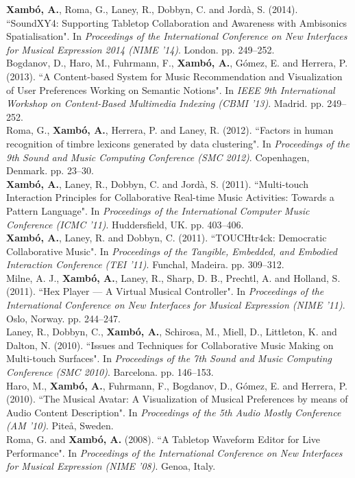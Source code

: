 \documentclass[10pt, a4paper]{article}
\newcommand{\years}[1]{\marginnote{\scriptsize #1}}
\begin{document}
{{\years{2014}\textbf{Xambó, A.}, Roma, G., Laney, R., Dobbyn, C. and Jordà, S. (2014). “SoundXY4: Supporting Tabletop Collaboration and Awareness with Ambisonics Spatialisation". In \emph{Proceedings of the International Conference on New Interfaces for Musical Expression 2014 (NIME '14)}. London. pp. 249--252.\\
\years{2013}Bogdanov, D., Haro, M., Fuhrmann, F., \textbf{Xambó, A.}, Gómez, E. and Herrera, P. (2013). “A Content-based System for Music Recommendation and Visualization of User Preferences Working on Semantic Notions". In \emph{IEEE 9th International Workshop on Content-Based Multimedia Indexing (CBMI '13)}. Madrid. pp. 249--252.\\
\years{2012}Roma, G., \textbf{Xambó, A.}, Herrera, P. and Laney, R. (2012). “Factors in human recognition of timbre lexicons generated by data clustering". In \emph{Proceedings of the 9th Sound and Music Computing Conference (SMC 2012)}. Copenhagen, Denmark. pp. 23--30.\\
\years{2011c}\textbf{Xambó, A.}, Laney, R., Dobbyn, C. and Jordà, S. (2011). “Multi-touch Interaction Principles for Collaborative Real-time Music Activities: Towards a Pattern Language". In \emph{Proceedings of the International Computer Music Conference (ICMC '11)}. Huddersfield, UK. pp. 403--406.\\
\years{2011b}\textbf{Xambó, A.}, Laney, R. and Dobbyn, C. (2011). “TOUCHtr4ck: Democratic Collaborative Music". In \emph{Proceedings of the Tangible, Embedded, and Embodied Interaction Conference (TEI '11)}. Funchal, Madeira. pp. 309--312.\\
\years{2011a}Milne, A. J., \textbf{Xambó, A.}, Laney, R., Sharp, D. B., Prechtl, A. and Holland, S. (2011). “Hex Player — A Virtual Musical Controller". In \emph{Proceedings of the International Conference on New Interfaces for Musical Expression (NIME '11)}. Oslo, Norway. pp. 244--247.\\
\years{2010b}Laney, R., Dobbyn, C., \textbf{Xambó, A.}, Schirosa, M., Miell, D., Littleton, K. and Dalton, N. (2010). “Issues and Techniques for Collaborative Music Making on Multi-touch Surfaces". In \emph{Proceedings of the 7th Sound and Music Computing Conference (SMC 2010)}. Barcelona. pp. 146–153.\\
\years{2010a}Haro, M., \textbf{Xambó, A.}, Fuhrmann, F., Bogdanov, D., Gómez, E. and Herrera, P. (2010). “The Musical Avatar: A Visualization of Musical Preferences by means of Audio Content Description". In \emph{Proceedings of the 5th Audio Mostly Conference (AM '10)}. Piteå, Sweden.\\
\years{2008}Roma, G. and \textbf{Xambó, A.} (2008). “A Tabletop Waveform Editor for Live Performance". In \emph{Proceedings of the International Conference on New Interfaces for Musical Expression (NIME '08)}. Genoa, Italy.

}}
\end{document}
